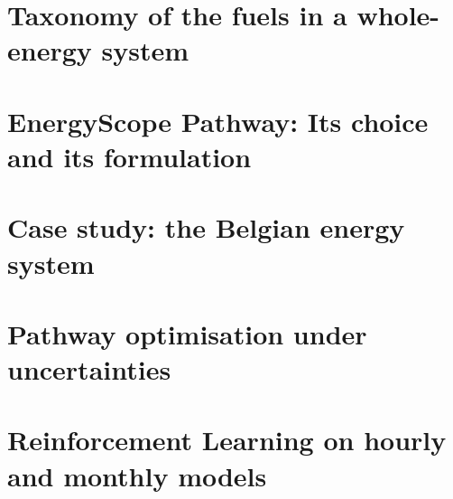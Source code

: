 \documentclass[a4paper,twoside,10pt,final]{memoir} %
\begin{document}

\clearemptydoublepage
{\footnotesize}
\thispagestyle{empty}

\clearemptydoublepage






\begin{appendices}
\clearemptydoublepage
\chapter{Taxonomy of the fuels in a whole-energy system}
\label{app:Taxonomy}
\thispagestyle{empty}


\clearemptydoublepage
\chapter{EnergyScope Pathway: Its choice and its formulation}
\label{app:EnergyScope}
\thispagestyle{empty}


\clearemptydoublepage
\chapter{Case study: the Belgian energy system}
\label{app:case_study}
\thispagestyle{empty}


\clearemptydoublepage
\chapter{Pathway optimisation under uncertainties}
\label{app:results_UQ}
\thispagestyle{empty}


%
\clearemptydoublepage
\chapter{Reinforcement Learning on hourly and monthly models}
\label{app:app_RL_TD_MO}
\thispagestyle{empty}

%
%
\end{appendices}
\end{document}
